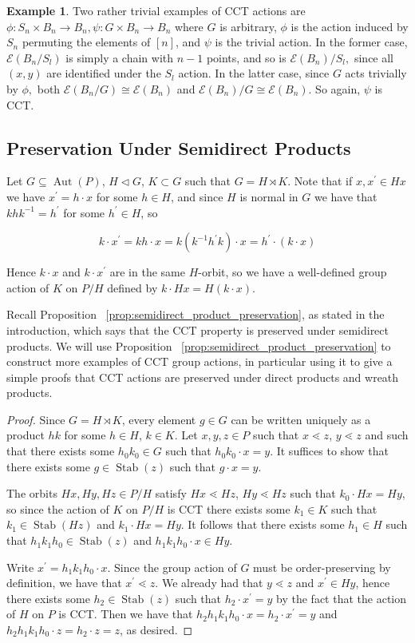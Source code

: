 \documentclass[10 pt]{amsart}
\theoremstyle{plain}
\theoremstyle{definition}
\newtheorem{eg}[thm]{Example}
\theoremstyle{remark}
\numberwithin{equation}{section}
\newcommand\ssec{\subsection}
\def\Stab{\operatorname{Stab}}
\begin{document}
\begin{eg}
\label{eg:trivial_edgequot}
Two rather trivial examples of CCT actions are $\phi:S_n\times B_n \rightarrow B_n,\psi:G\times B_n\rightarrow B_n$ where $G$ is arbitrary, $\phi$ is the action induced by $S_n$ permuting the elements of $[n]$, and $\psi$ is the trivial action. In the former case, $\mathcal E(B_n/S_l)$ is simply a chain with $n-1$ points, and so is $\mathcal E(B_n)/S_l,$ since all $(x, y)$ are identified under the $S_l$ action. In the latter case, since $G$ acts trivially by $\phi,$ both  $\mathcal E(B_n/G) \cong \mathcal E(B_n)$ and $\mathcal E(B_n)/G \cong \mathcal E(B_n).$ So again, $\psi$ is CCT.
\end{eg}

\ssec{Preservation Under Semidirect Products}
\label{ssec:semidirect_product_preservation}
Let $G\subseteq\operatorname{Aut}(P)$, $H\triangleleft G$, $K\subset G$ such that $G = H\rtimes K$.  Note that if $x,x^\prime\in Hx$ we have $x^\prime = h\cdot x$ for some $h\in H$, and since $H$ is normal in $G$ we have that $khk^{-1} = h^\prime$ for some $h^\prime\in H$, so 

$$k\cdot x^\prime = kh\cdot x = k(k^{-1}h^\prime k)\cdot x = h^\prime\cdot (k\cdot x)$$

Hence $k\cdot x$ and $k\cdot x^\prime$ are in the same $H$-orbit, so we have a well-defined group action of $K$ on $P/H$ defined by $k\cdot Hx = H(k\cdot x)$.

Recall Proposition ~\ref{prop:semidirect_product_preservation}, as stated in the introduction, which says that the CCT property is preserved under semidirect products.  We will use Proposition ~\ref{prop:semidirect_product_preservation} to construct more examples of CCT group actions, in particular using it to give a simple proofs that CCT actions are preserved under direct products and wreath products.

\semidirect*



\begin{proof}
Since $G = H\rtimes K$, every element $g\in G$ can be written uniquely as a product $hk$ for some $h\in H$, $k\in K$.  Let $x,y,z\in P$ such that $x\lessdot z$, $y\lessdot z$ and such that there exists some $h_0k_0\in G$ such that $h_0k_0\cdot x = y$.  It suffices to show that there exists some $g\in \Stab(z)$ such that $g\cdot x = y$.

The orbits $Hx, Hy, Hz\in P/H$ satisfy $Hx\lessdot Hz$, $Hy\lessdot Hz$ such that $k_0\cdot Hx = Hy$, so since the action of $K$ on $P/H$ is CCT there exists some $k_1\in K$ such that $k_1\in \Stab(Hz)$ and $k_1\cdot Hx = Hy$.  It follows that there exists some $h_1\in H$ such that $h_1k_1h_0\in \Stab(z)$ and $h_1k_1h_0\cdot x\in Hy$.

Write $x^\prime = h_1k_1h_0\cdot x$.  Since the group action of $G$ must be order-preserving by definition, we have that $x^\prime \lessdot z$.  We already had that $y\lessdot z$ and $x^\prime\in Hy$, hence there exists some $h_2\in \Stab(z)$ such that $h_2\cdot x^\prime = y$ by the fact that the action of $H$ on $P$ is CCT.  Then we have that $h_2h_1k_1h_0\cdot x = h_2\cdot x^\prime = y$ and $h_2h_1k_1h_0\cdot z = h_2\cdot z = z$, as desired.
\end{proof}
\end{document}
